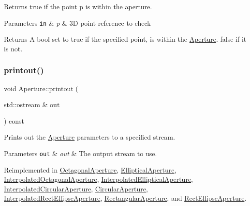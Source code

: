 Returns true if the point p is within the aperture. 
\begin{DoxyParams}[1]{Parameters}
\mbox{\tt in}  & {\em p} & 3D point reference to check \\
\hline
\end{DoxyParams}
\begin{DoxyReturn}{Returns}
A bool set to true if the specified point, is within the \hyperlink{classAperture}{Aperture}. false if it is not. 
\end{DoxyReturn}
\mbox{\label{classAperture_aff2f276b93bb2cb94e559e1c4901e38e}} 
\subsubsection{\texorpdfstring{printout()}{printout()}}
{\footnotesize\ttfamily void Aperture\+::printout (\begin{DoxyParamCaption}\item[{std\+::ostream \&}]{out }\end{DoxyParamCaption}) const\hspace{0.3cm}{\ttfamily [virtual]}}

Prints out the \hyperlink{classAperture}{Aperture} parameters to a specified stream. 
\begin{DoxyParams}[1]{Parameters}
\mbox{\tt out}  & {\em out} & The output stream to use. \\
\hline
\end{DoxyParams}


Reimplemented in \hyperlink{classOctagonalAperture_ad8329324a912bc76c97fd3f8bbefa5ac}{Octagonal\+Aperture}, \hyperlink{classEllipticalAperture_af45343465b84072027de770839bbd73d}{Elliptical\+Aperture}, \hyperlink{classInterpolatedOctagonalAperture_ad1e9dcb72289db534c78e297fa4c8197}{Interpolated\+Octagonal\+Aperture}, \hyperlink{classInterpolatedEllipticalAperture_aee15c62d0ff01c37120481cc821f9d87}{Interpolated\+Elliptical\+Aperture}, \hyperlink{classInterpolatedCircularAperture_af32b8d603ed9dd511c3b00a045400795}{Interpolated\+Circular\+Aperture}, \hyperlink{classCircularAperture_af7380933fd3494dd0d1868b655a78b08}{Circular\+Aperture}, \hyperlink{classInterpolatedRectEllipseAperture_abd88d2108988e8653517e3291dd92ff2}{Interpolated\+Rect\+Ellipse\+Aperture}, \hyperlink{classRectangularAperture_ab3a9514337b3fd3f2368f03ab6410533}{Rectangular\+Aperture}, and \hyperlink{classRectEllipseAperture_a13285bdfb9c849fe94cd261ae1bfffe4}{Rect\+Ellipse\+Aperture}.

